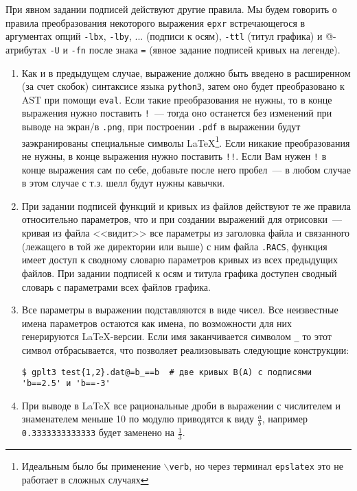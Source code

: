 \documentclass[12pt]{article}
\def\python{{\tt python3}}
\def\png{{\tt .png}}
\def\pdf{{\tt .pdf}}
\begin{document}
При явном задании подписей  действуют другие правила.
Мы будем говорить о правила преобразования некоторого выражения \verb'epxr' встречающегося в аргументах опций
\verb'-lbx', \verb'-lby', ... (подписи к осям),  \verb'-ttl' (титул графика) и @-атрибутах \verb'-U' и \verb'-fn' после знака \verb'='
(явное задание подписей кривых на легенде).   
\begin{enumerate}
\item Как и в предыдущем случае, выражение должно быть введено в расширенном (за счет скобок) синтаксисе языка \python,
  затем оно будет преобразовано к AST при помощи \verb'eval'. Если такие преобразования не нужны, то в конце выражения
  нужно поставить \verb'!'~--- тогда оно останется без изменений при выводе на экран/в \png, при построении \pdf{} в выражении
  будут заэкранированы специальные символы \LaTeX{}\footnote{Идеальным было бы применение {\tt $\backslash$verb}, но через терминал {\tt epslatex}
    это не работает в сложных случаях}.  
  Если никакие преобразования не нужны, в конце выражения нужно поставить \verb'!!'. Если Вам нужен \verb'!' в конце выражения сам по себе,
  добавьте после него пробел~--- в любом случае в этом случае с т.з. шелл будут нужны кавычки.
\item При задании подписей функций и кривых из файлов действуют те же правила относительно параметров, что и при создании выражений для отрисовки~---
  кривая из файла <<видит>> все параметры из заголовка файла и связанного (лежащего в той же директории или выше) с ним файла \verb'.RACS',
  функция имеет доступ к сводному словарю параметров кривых из всех предыдущих файлов. При задании подписей к осям и титула графика
  доступен сводный словарь с параметрами всех файлов графика.
\item Все параметры в выражении подставляются в виде чисел.  Все неизвестные имена параметров остаются как имена, по возможности для них генерируются \LaTeX{}-версии.
  Если имя заканчивается символом \verb'_' то этот символ отбрасывается, что позволяет реализовывать следующие конструкции:
\begin{verbatim}
$ gplt3 test{1,2}.dat@=b_==b  # две кривых B(A) с подписями 'b==2.5' и 'b==-3'
\end{verbatim}
\item   При выводе в \LaTeX{} все рациональные дроби в выражении
  с числителем и знаменателем меньше 10 по модулю приводятся к виду $\frac ab$, например \verb'0.3333333333333' будет заменено на $\frac13$.
\end{enumerate}
\end{document}
